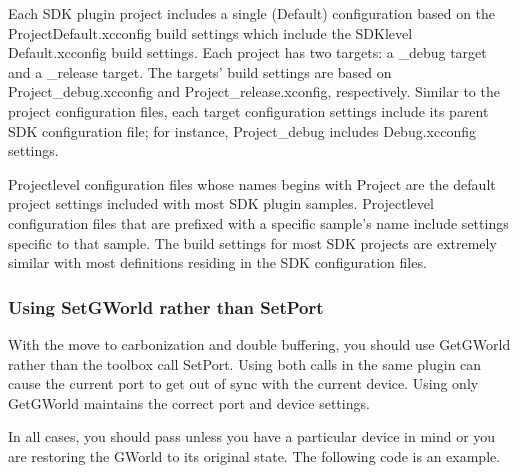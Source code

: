 \documentclass[letterpaper,12pt,english,openany,oneside]{sphinxmanual}
\begin{document}
Each SDK plugin project includes a single (Default) configuration based on the ProjectDefault.xcconfig build settings which include the SDK\sphinxhyphen{}level Default.xcconfig build settings. Each project has two targets: a \_debug target and a \_release target. The targets’ build settings are based on Project\_debug.xcconfig and Project\_release.xconfig, respectively. Similar to the project configuration files, each target configuration settings include its parent SDK configuration file; for instance, Project\_debug includes Debug.xcconfig settings.

Project\sphinxhyphen{}level configuration files whose names begins with Project are the default project settings included with most SDK plugin samples. Project\sphinxhyphen{}level configuration files that are prefixed with a specific sample’s name include settings specific to that sample. The build settings for most SDK projects are extremely similar with most definitions residing in the SDK configuration files.


\subsubsection{Using SetGWorld rather than SetPort}
\label{\detokenize{Plugins_CreatingSimplePlug:using-setgworld-rather-than-setport}}
With the move to carbonization and double buffering, you should use GetGWorld rather than the toolbox call SetPort. Using both calls in the same plugin can cause the current port to get out of sync with the current device. Using only GetGWorld maintains the correct port and device settings.

In all cases, you should pass  unless you have a particular device in mind or you are restoring the GWorld to its original state. The following code is an example.

\begin{sphinxVerbatim}[commandchars=\\\{\}]
    
         
      
       
      
          
          
             
          
          
\end{sphinxVerbatim}
\end{document}
